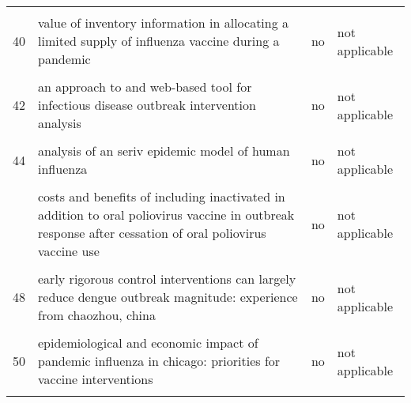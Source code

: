 \documentclass[
]{article}
\begin{document}
\begin{landscape}
\begin{longtable}{l>{\raggedright\arraybackslash}p{4cm}l>{\raggedright\arraybackslash}p{4cm}}
\cellcolor{gray!6}{39} & \cellcolor{gray!6}{the potential impact of case-area targeted interventions in response to cholera outbreaks: a modeling study} & \cellcolor{gray!6}{yes} & \cellcolor{gray!6}{yes}\\
40 & value of inventory information in allocating a limited supply of influenza vaccine during a pandemic & no & not applicable\\
\addlinespace
\cellcolor{gray!6}{41} & \cellcolor{gray!6}{an age-structured model for cholera control with vaccination} & \cellcolor{gray!6}{no} & \cellcolor{gray!6}{not applicable}\\
42 & an approach to and web-based tool for infectious disease outbreak intervention analysis & no & not applicable\\
\cellcolor{gray!6}{43} & \cellcolor{gray!6}{an economic assessment of foot and mouth disease in japan} & \cellcolor{gray!6}{yes} & \cellcolor{gray!6}{no}\\
44 & analysis of an seriv epidemic model of human influenza & no & not applicable\\
\cellcolor{gray!6}{45} & \cellcolor{gray!6}{control strategies of avian influenza pandemic model with time delay} & \cellcolor{gray!6}{no} & \cellcolor{gray!6}{not applicable}\\
\addlinespace
46 & costs and benefits of including inactivated in addition to oral poliovirus vaccine in outbreak response after cessation of oral poliovirus vaccine use & no & not applicable\\
\cellcolor{gray!6}{47} & \cellcolor{gray!6}{deriving effective vaccine allocation strategies for pandemic influenza: comparison of an agent-based simulation and a compartmental model} & \cellcolor{gray!6}{no} & \cellcolor{gray!6}{not applicable}\\
48 & early rigorous control interventions can largely reduce dengue outbreak magnitude: experience from chaozhou, china & no & not applicable\\
\cellcolor{gray!6}{49} & \cellcolor{gray!6}{effects of reactive social distancing on the 1918 influenza pandemic} & \cellcolor{gray!6}{no} & \cellcolor{gray!6}{not applicable}\\
50 & epidemiological and economic impact of pandemic influenza in chicago: priorities for vaccine interventions & no & not applicable\\
\addlinespace
\cellcolor{gray!6}{51} & \cellcolor{gray!6}{estimating direct and indirect protective effect of influenza vaccination in the united states} & \cellcolor{gray!6}{no} & \cellcolor{gray!6}{not applicable}\\

\end{longtable}
\end{landscape}
\end{document}
